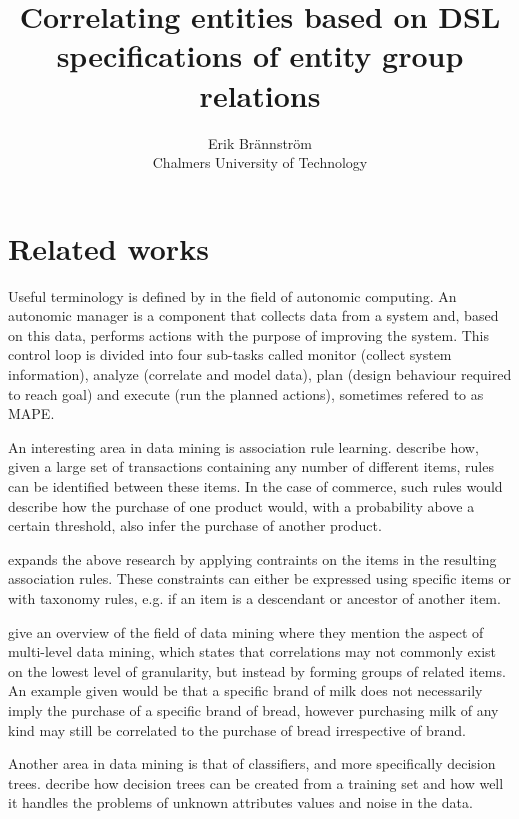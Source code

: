 \documentclass[a4paper]{article}
\begin{document}
\title{Correlating entities based on DSL specifications of entity group relations}
\author{Erik Brännström\\
  Chalmers University of Technology}
\date{}
\maketitle

\section{Related works}
Useful terminology is defined by \citet{IBM2006} in the field of autonomic computing. An autonomic manager is a component that
collects data from a system and, based on this data, performs actions with the purpose of improving the system. This control
loop is divided into four sub-tasks called monitor (collect system information), analyze (correlate and model data), plan
(design behaviour required to reach goal) and execute (run the planned actions), sometimes refered to as MAPE.

An interesting area in data mining is association rule learning. \citet{Agrawal1993} describe how, given a large set of
transactions containing any number of different items, rules can be identified between these items. In the case of commerce,
such rules would describe how the purchase of one product would, with a probability above a certain threshold, also infer
the purchase of another product.

\citet{Srikant1997} expands the above research by applying contraints on the items in the resulting association rules. These
constraints can either be expressed using specific items or with taxonomy rules, e.g. if an item is a descendant or ancestor
of another item.

\citet{Chen1996} give an overview of the field of data mining where they mention the aspect of multi-level data mining, which
states that correlations may not commonly exist on the lowest level of granularity, but instead by forming groups of related
items. An example given would be that a specific brand of milk does not necessarily imply the purchase of a specific brand of
bread, however purchasing milk of any kind may still be correlated to the purchase of bread irrespective of brand.

Another area in data mining is that of classifiers, and more specifically decision trees. \citet{Quinlan1986} decribe how
decision trees can be created from a training set and how well it handles the problems of unknown attributes values and noise
in the data.
\end{document}
